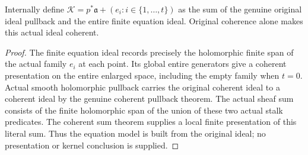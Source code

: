 \begin{theorem}
\label{hir:relative-normal-deformation-original-ideal}
\leanok
{}
Internally define
$\mathcal K=p^*\mathfrak a+(e_i:i\in\{1,\ldots,t\})$
as the sum of the genuine original ideal pullback and the entire finite
equation ideal. Original coherence alone makes this actual ideal coherent.
\end{theorem}
\begin{proof}
The finite equation ideal records precisely the holomorphic finite span of
the actual family $e_i$ at each point. Its global entire generators give a
coherent presentation on the entire enlarged space, including the empty
family when $t=0$. Actual smooth holomorphic pullback carries the original
coherent ideal to a coherent ideal by the genuine coherent pullback theorem.
The actual sheaf sum consists of the finite holomorphic span of the union of
these two actual stalk predicates. The coherent sum theorem supplies a local
finite presentation of this literal sum. Thus the equation model is built
from the original ideal; no presentation or kernel conclusion is supplied.
\end{proof}

